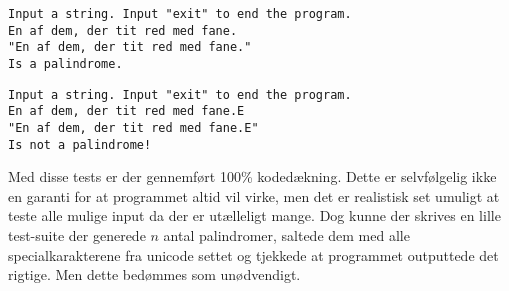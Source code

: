 	\begin{lstlisting}[caption=Genkendelse af palindrom]
Input a string. Input "exit" to end the program.
En af dem, der tit red med fane.
"En af dem, der tit red med fane."
Is a palindrome.
	\end{lstlisting}
	\begin{lstlisting}[caption=Afvisning af ikke-palindrom]
Input a string. Input "exit" to end the program.
En af dem, der tit red med fane.E
"En af dem, der tit red med fane.E"
Is not a palindrome!
	\end{lstlisting}
	Med disse tests er der gennemført 100\% kodedækning. Dette er selvfølgelig ikke en garanti for at programmet altid vil virke, men det er realistisk set umuligt at teste alle mulige input da der er utælleligt mange. Dog kunne der skrives en lille test-suite der generede $n$ antal palindromer, saltede dem med alle specialkarakterene fra unicode settet og tjekkede at programmet outputtede det rigtige. Men dette bedømmes som unødvendigt.
	